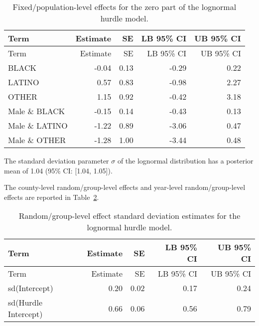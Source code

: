 \documentclass[
  letterpaper,
  DIV=11,
  numbers=noendperiod]{scrartcl}
\begin{document}
\hypertarget{tbl-brms-hurdle-model-summary-2-zero-racesex}{}
\begin{longtable}[]{@{}lrrrr@{}}
\caption{\label{tbl-brms-hurdle-model-summary-2-zero-racesex}Fixed/population-level
effects for the zero part of the lognormal hurdle model.}\tabularnewline
\toprule\noalign{}
Term & Estimate & SE & LB 95\% CI & UB 95\% CI \\
\midrule\noalign{}
\endfirsthead
\toprule\noalign{}
Term & Estimate & SE & LB 95\% CI & UB 95\% CI \\
\midrule\noalign{}
\endhead
\bottomrule\noalign{}
\endlastfoot
BLACK & -0.04 & 0.13 & -0.29 & 0.22 \\
LATINO & 0.57 & 0.83 & -0.98 & 2.27 \\
OTHER & 1.15 & 0.92 & -0.42 & 3.18 \\
Male \& BLACK & -0.15 & 0.14 & -0.43 & 0.13 \\
Male \& LATINO & -1.22 & 0.89 & -3.06 & 0.47 \\
Male \& OTHER & -1.28 & 1.00 & -3.44 & 0.48 \\
\end{longtable}

The standard deviation parameter \(\sigma\) of the lognormal
distribution has a posterior mean of 1.04 (95\% CI: {[}1.04, 1.05{]}).

The county-level random/group-level effects and year-level
random/group-level effects are reported in Table~\ref{tbl-brms2-re}.

\hypertarget{tbl-brms2-re}{}
\begin{longtable}[]{@{}lrrrr@{}}
\caption{\label{tbl-brms2-re}Random/group-level effect standard
deviation estimates for the lognormal hurdle model.}\tabularnewline
\toprule\noalign{}
Term & Estimate & SE & LB 95\% CI & UB 95\% CI \\
\midrule\noalign{}
\endfirsthead
\toprule\noalign{}
Term & Estimate & SE & LB 95\% CI & UB 95\% CI \\
\midrule\noalign{}
\endhead
\bottomrule\noalign{}
\endlastfoot
sd(Intercept) & 0.20 & 0.02 & 0.17 & 0.24 \\
sd(Hurdle Intercept) & 0.66 & 0.06 & 0.56 & 0.79 \\
\end{longtable}
\end{document}
